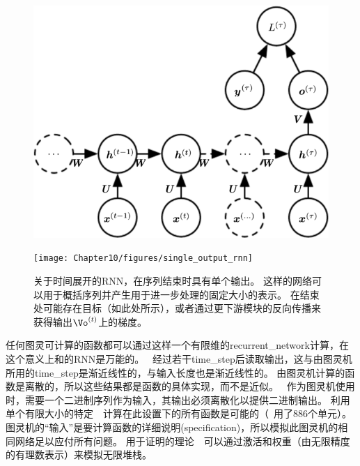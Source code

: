 \begin{figure}[!htb]
\ifOpenSource
\centerline{\includegraphics[scale=0.5]{images/93.png}}
\else
\centerline{\texttt{[image: Chapter10/figures/single\_output\_rnn]}}
\fi
\caption{关于时间展开的\gls{RNN}，在序列结束时具有单个输出。
这样的网络可以用于概括序列并产生用于进一步处理的固定大小的表示。
在结束处可能存在目标（如此处所示），或者通过更下游模块的反向传播来获得输出$\Vo^{(t)}$上的梯度。
}
\label{fig:chap10_single_output_rnn}
\end{figure}

任何图灵可计算的函数都可以通过这样一个有限维的\gls{recurrent_network}计算，在这个意义上和的\gls{RNN}是万能的。
~经过若干\gls{time_step}后读取输出，这与由图灵机所用的\gls{time_step}是渐近线性的，与输入长度也是渐近线性的\citep{Siegelmann-Sontag-1991,Siegelmann-1995,Siegelmann-Sontag-1995,Hyotyniemi-1996}。
由图灵机计算的函数是离散的，所以这些结果都是函数的具体实现，而不是近似。
~作为图灵机使用时，需要一个二进制序列作为输入，其输出必须离散化以提供二进制输出。
利用单个有限大小的特定~~计算在此设置下的所有函数是可能的（~\cite{Siegelmann-Sontag-1995}用了886个单元）。
图灵机的``输入''是要计算函数的详细说明(specification)，所以模拟此图灵机的相同网络足以应付所有问题。
用于证明的理论~~可以通过激活和权重（由无限精度的有理数表示）来模拟无限堆栈。


